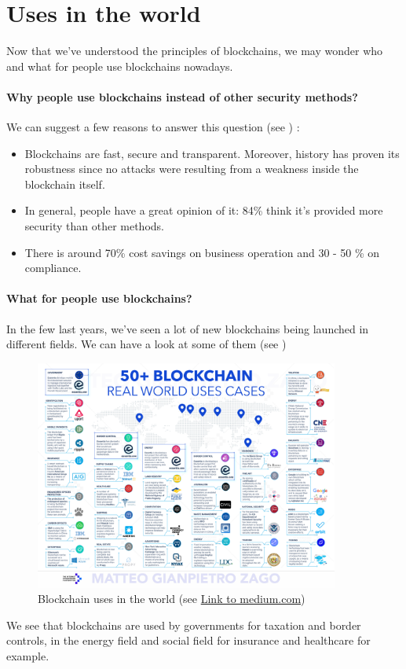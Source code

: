 \section{Uses in the world}

Now that we've understood the principles of blockchains, we may wonder who and what for people use blockchains nowadays.

\paragraph{Why people use blockchains instead of other security methods?}

We can suggest a few reasons to answer this question (see \cite{blockchainPros}) :

\begin{itemize}
  \item Blockchains are fast, secure and transparent. Moreover, history has proven its robustness since no attacks were resulting from a weakness inside the blockchain itself.
  \item In general, people have a great opinion of it: 84\% think it's provided more security than other methods.
  \item There is around 70\% cost savings on business operation and 30 - 50 \% on compliance.
\end{itemize}

\paragraph{What for people use blockchains?}

In the few last years, we've seen a lot of new blockchains being launched in different fields. We can have a look at some of them (see \cite{usesBlockchain})\newline

\begin{figure}[ht]
\centering
\includegraphics[width=10cm]{Figures/blockchainUses}
\caption{Blockchain uses in the world (see \href{https://medium.com/@matteozago/50-examples-of-how-blockchains-are-taking-over-the-world-4276bf488a4b}{Link to medium.com})}
\end{figure}
\medskip

We see that blockchains are used by governments for taxation and border controls, in the energy field and social field for insurance and healthcare for example.
